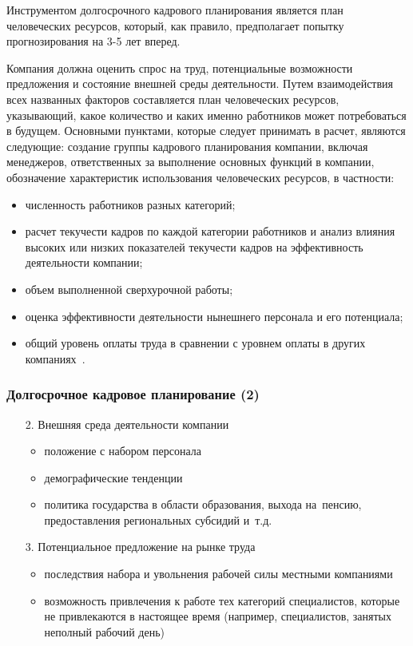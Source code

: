 \documentclass{../industrial-development}
\begin{document}
\lecturenotes

Инструментом долгосрочного кадрового планирования является план человеческих ресурсов, который, как правило, предполагает попытку прогнозирования на 3-5 лет вперед.

Компания должна оценить спрос на труд, потенциальные возможности предложения и состояние внешней среды деятельности. Путем взаимодействия всех названных факторов составляется план человеческих ресурсов, указывающий, какое количество и
каких именно работников может потребоваться в будущем. Основными пунктами, которые следует принимать в расчет, являются следующие: создание группы кадрового планирования компании, включая менеджеров, ответственных за выполнение основных функций в компании, обозначение характеристик использования человеческих ресурсов, в частности:
\begin{itemize}
	\item численность работников разных категорий;
	\item расчет текучести кадров по каждой категории работников и анализ влияния высоких
	или низких показателей текучести кадров на эффективность деятельности компании;
	\item объем выполненной сверхурочной работы;
	\item оценка эффективности деятельности нынешнего персонала и его потенциала;
	\item общий уровень оплаты труда в сравнении с уровнем оплаты в других компаниях~\cite[с.~86]{Ivanova}.
\end{itemize}

\begin{frame} \frametitle{Долгосрочное кадровое планирование (2)}
	\begin{itemize}
		\item[2.] Внешняя среда деятельности компании
		\begin{itemize}
			\item	положение с набором персонала
			\item	демографические тенденции
			\item политика государства в области образования, выхода на~пенсию, предоставления региональных субсидий и~т.д.
		\end{itemize}
		
		\item[3.] Потенциальное предложение на рынке труда
		\begin{itemize}
			\item последствия набора и увольнения рабочей силы местными компаниями
			\item возможность привлечения к работе тех категорий специалистов, которые не привлекаются в настоящее время (например, специалистов, занятых неполный рабочий день)
		\end{itemize}
	\end{itemize}
\end{frame}
\end{document}
